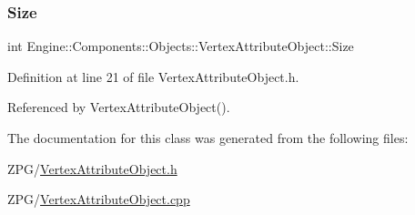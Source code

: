 \subsubsection{\texorpdfstring{Size}{Size}}
{\footnotesize\ttfamily int Engine\+::\+Components\+::\+Objects\+::\+Vertex\+Attribute\+Object\+::\+Size}



Definition at line 21 of file Vertex\+Attribute\+Object.\+h.



Referenced by Vertex\+Attribute\+Object().



The documentation for this class was generated from the following files\+:\begin{DoxyCompactItemize}
\item 
Z\+P\+G/\mbox{\hyperlink{VertexAttributeObject_8h}{Vertex\+Attribute\+Object.\+h}}\item 
Z\+P\+G/\mbox{\hyperlink{VertexAttributeObject_8cpp}{Vertex\+Attribute\+Object.\+cpp}}\end{DoxyCompactItemize}
